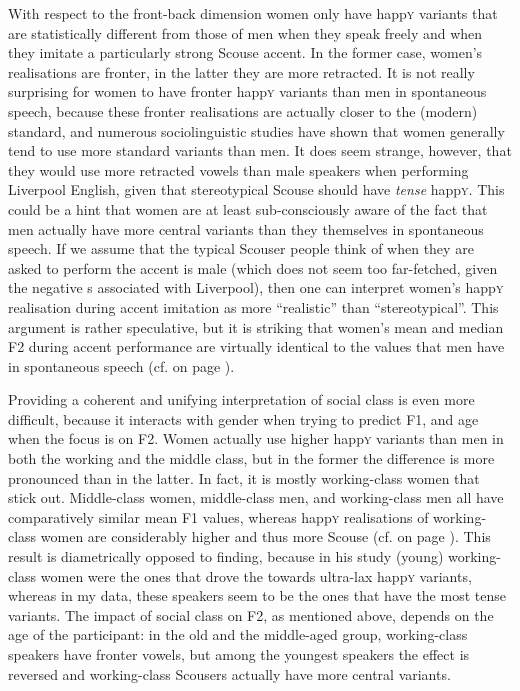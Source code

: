 With respect to the front-back dimension women only have happ\textsc{y} variants that are statistically different from those of men when they speak freely and when they imitate a particularly strong Scouse accent.
In the former case, women's realisations are fronter, in the latter they are more retracted.
It is not really surprising for women to have fronter happ\textsc{y} variants than men in spontaneous speech, because these fronter realisations are actually closer to the (modern) standard, and numerous sociolinguistic studies have shown that women generally tend to use more standard variants than men.
It does seem strange, however, that they would use more retracted vowels than male speakers when performing Liverpool English, given that stereotypical Scouse should have \emph{tense} happ\textsc{y}.
This could be a hint that women are at least sub-consciously aware of the fact that men actually have more central variants than they themselves in spontaneous speech.
If we assume that the typical Scouser people think of when they are asked to perform the accent is male (which does not seem too far-fetched, given the negative s associated with Liverpool), then one can interpret women's happ\textsc{y} realisation during accent imitation as more ``realistic'' than ``stereotypical''.
This argument is rather speculative, but it is striking that women's mean and median F2 during accent performance are virtually identical to the values that men have in spontaneous speech (cf.  on page \pageref{fig.box.f2w.happy.stylegender}).

Providing a coherent and unifying interpretation of social class is even more difficult, because it interacts with gender when trying to predict F1, and age when the focus is on F2.
Women actually use higher happ\textsc{y} variants than men in both the working and the middle class, but in the former the difference is more pronounced than in the latter.
In fact, it is mostly working-class women that stick out.
Middle-class women, middle-class men, and working-class men all have comparatively similar mean F1 values, whereas happ\textsc{y} realisations of working-class women are considerably higher and thus more Scouse (cf.  on page \pageref{fig.box.f1w.happy.genderclass}).
This result is diametrically opposed to  finding, because in his study (young) working-class women were the ones that drove the  towards ultra-lax happ\textsc{y} variants, whereas in my data, these speakers seem to be the ones that have the most tense variants.
The impact of social class on F2, as mentioned above, depends on the age of the participant: in the old and the middle-aged group, working-class speakers have fronter vowels, but among the youngest speakers the effect is reversed and working-class Scousers actually have more central variants.

